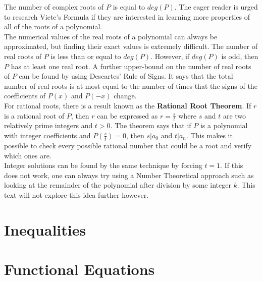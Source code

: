 \documentclass[a4paper,12pt]{article}
\begin{document}
The number of complex roots of $P$ is equal to $deg(P)$. The eager reader is urged to research Viete's Formula if they are interested in learning more properties of all of the roots of a polynomial. \\

The numerical values of the real roots of a polynomial can always be approximated, but finding their exact values is extremely difficult. The number of real roots of $P$ is less than or equal to $deg(P)$. However, if $deg(P)$ is odd, then $P$ has at least one real root. A further upper-bound on the number of real roots of $P$ can be found by using Descartes' Rule of Signs. It says that the total number of real roots is at most equal to the number of times that the signs of the coefficients of $P(x)$ and $P(-x)$ change. \\

For rational roots, there is a result known as the \textbf{Rational Root Theorem}. If $r$ is a rational root of $P$, then $r$ can be expressed as $r = \frac{s}{t}$ where $s$ and $t$ are two relatively prime integers and $t > 0$. The theorem says that if $P$ is a polynomial with integer coefficients and $P(\frac{s}{t}) = 0$, then $s | a_0$ and $t | a_n$. This makes it possible to  check every possible rational number that could be a root and verify which ones are.\\

Integer solutions can be found by the same technique by forcing $t = 1$. If this does not work, one can always try using a Number Theoretical approach such as looking at the remainder of the polynomial after division by some integer $k$. This text will not explore this idea further however.

\section{Inequalities}

\section{Functional Equations}
\end{document}
